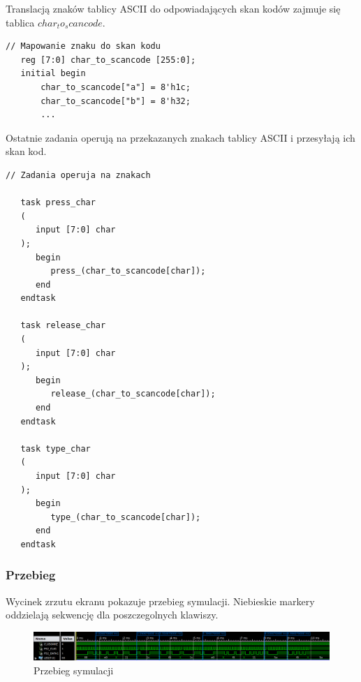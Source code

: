 \documentclass[a4paper,12pt]{article}
\begin{document}
Translacją znaków tablicy ASCII do odpowiadających skan kodów zajmuje się tablica $char_to_scancode$.
\begin{lstlisting}[label=Keyboard_behav,caption=Keyboard\_behav.v,firstnumber=220]
   // Mapowanie znaku do skan kodu
   reg [7:0] char_to_scancode [255:0];
   initial begin
       char_to_scancode["a"] = 8'h1c;
       char_to_scancode["b"] = 8'h32;
       ...
\end{lstlisting}

Ostatnie zadania operują na przekazanych znakach tablicy ASCII i przesyłają ich skan kod.
\begin{lstlisting}[label=Keyboard_behav,caption=Keyboard\_behav.v,firstnumber=262]
   // Zadania operuja na znakach

   task press_char
   (
      input [7:0] char
   );
      begin
         press_(char_to_scancode[char]);
      end
   endtask

   task release_char
   (
      input [7:0] char
   );
      begin
         release_(char_to_scancode[char]);
      end
   endtask

   task type_char
   (
      input [7:0] char
   );
      begin
         type_(char_to_scancode[char]);
      end
   endtask
\end{lstlisting}


\subsubsection{Przebieg}


Wycinek zrzutu ekranu pokazuje przebieg symulacji. Niebieskie markery oddzielają sekwencję dla poszczegolnych klawiszy.
\begin{figure}[htb]
   \centering
   \includegraphics[width=15cm]{grafika/keyboard_sim.png}
   \caption{Przebieg symulacji}
\end{figure}
\end{document}

